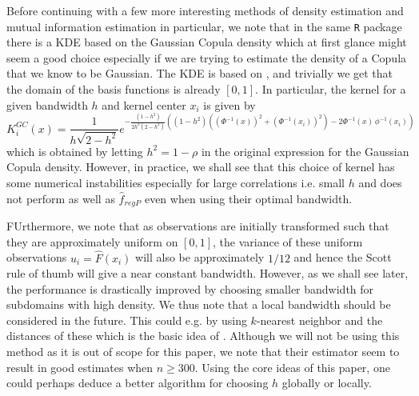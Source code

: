 \documentclass[../Thesis.tex]{subfiles}
\begin{document}
Before continuing with a few more interesting methods of density estimation and mutual information estimation in particular, we note that in the same \texttt{R} package there is a KDE based on the Gaussian Copula density which at first glance might seem a good choice especially if we are trying to estimate the density of a Copula that we know to be Gaussian. The KDE is based on \cite{Kernel-Type-Density-Estimation-on-the-Unit-Interval}, and trivially we get that the domain of the basis functions is already $[0,1]$. In particular, the kernel for a given bandwidth $h$ and kernel center $x_i$ is given by
$$K^{GC}_i \left(x\right) = \frac{1}{h \sqrt{2-h^2}} e^{-\frac{\left(1 - h^2\right)}{2 h^2 \left(2-h^2\right)} \left( \left(1 - h^2\right) \left(\left(\Phi^{-1} \left(x\right)\right)^2 + \left(\Phi^{-1} \left(x_i\right)\right)^2 \right) - 2 \Phi^{-1} \left(x\right) \, \phi^{-1}\left(x_i\right) \right) }$$
which is obtained by letting $h^2 = 1-\rho$ in the original expression for the Gaussian Copula density. However, in practice, we shall see that this choice of kernel has some numerical instabilities especially for large correlations i.e. small $h$ and does not perform as well as $\hat{f}_{regP}$ even when using their optimal bandwidth.

FUrthermore, we note that as observations are initially transformed such that they are approximately uniform on $[0,1]$, the variance of these uniform observations $u_i = \hat{F}\left(x_i\right)$ will also be approximately $1/12$ and hence the Scott rule of thumb will give a near constant bandwidth. However, as we shall see later, the performance is drastically improved by choosing smaller bandwidth for subdomains with high density. We thus note that a local bandwidth should be considered in the future. This could e.g. by using $k$-nearest neighbor and the distances of these which is the basic idea of \cite{Estimating-mutual-information-Kraskov}. Although we will not be using this method as it is out of scope for this paper, we note that their estimator seem to result in good estimates when $n \geq 300$. Using the core ideas of this paper, one could perhaps deduce a better algorithm for choosing $h$ globally or locally.
\end{document}
